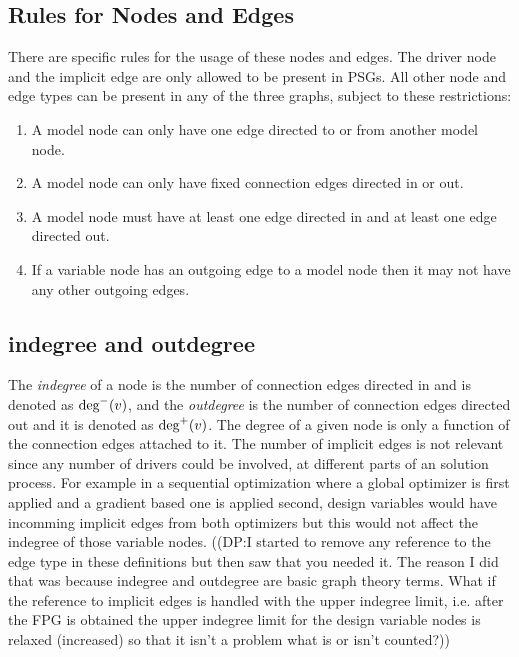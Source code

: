 \subsection{Rules for Nodes and Edges}
  \label{ss:rules}
  There are specific rules for the usage of these nodes and edges.
  The driver node and the implicit edge are only allowed to be present in PSGs. All 
  other node and edge types can be present in any of the three graphs, subject to these restrictions: 
  \begin{enumerate}
  \item A model node can only have one edge directed to or from another model node.
  \item A model node can only have fixed connection edges directed in or out.
  \item A model node must have at least one edge directed in and at least one edge 
    directed out.
  \item If a variable node has an outgoing edge to a model node then it may not have 
    any other outgoing edges.
  \end{enumerate}

\subsection{indegree and outdegree}
  \label{s:indegree-outdegree}
  The \emph{indegree} of a node is the number of connection edges directed in and 
  is denoted as $\textrm{deg}^-(v)$, and the \emph{outdegree} 
  is the number of connection edges directed out and it is denoted as $\textrm{deg}^+(v)$.
  The degree of a given node is only a function of the connection edges 
  attached to it. The number of implicit edges is not relevant since any number 
  of drivers could be involved, at different parts of an solution process. For 
  example in a sequential optimization where a global optimizer is first applied
  and a gradient based one is applied second, design variables would have incomming 
  implicit edges from both optimizers but this would not affect the indegree of those
  variable nodes. 
  ((DP:I started to remove any reference to the edge type in these definitions but then saw that you needed it. The reason I did that was because indegree and outdegree are basic graph theory terms. What if the reference to implicit edges is handled with the upper indegree limit, i.e. after the FPG is obtained the upper indegree limit for the design variable nodes is relaxed (increased) so that it isn't a problem what is or isn't counted?))

